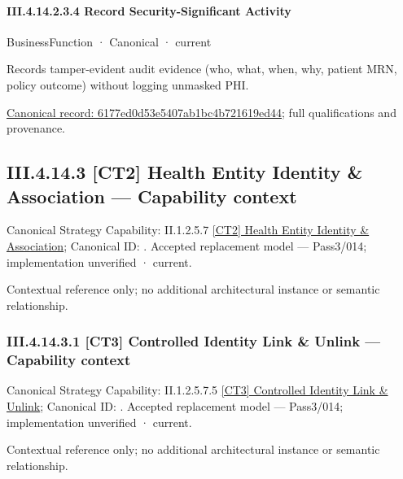 \paragraph*{III.4.14.2.3.4 Record Security-Significant Activity}
\label{navigation:III.4.14.2.3.4}

\label{element:6177ed0d53e5407ab1bc4b721619ed44}
{\small BusinessFunction · Canonical · current}\par

Records tamper-evident audit evidence (who, what, when, why, patient MRN, policy outcome) without logging unmasked PHI.


{\footnotesize \href{../../../../continuum/business/business-function/6177ed0d53e5407ab1bc4b721619ed44.md}{Canonical record: 6177ed0d53e5407ab1bc4b721619ed44}; full qualifications and provenance.}\par
\subsection*{III.4.14.3 [CT2] Health Entity Identity \& Association — Capability context}
\label{navigation:III.4.14.3}

{\small Canonical Strategy Capability: II.1.2.5.7 \hyperref[element:7cbb4c6253164e19ab3a126c8f176f21]{[CT2] Health Entity Identity \& Association}; Canonical ID: \texttt{}. Accepted replacement model — Pass3/014; implementation unverified · current.}\par
Contextual reference only; no additional architectural instance or semantic relationship.\par
\subsubsection*{III.4.14.3.1 [CT3] Controlled Identity Link \& Unlink — Capability context}
\label{navigation:III.4.14.3.1}

{\small Canonical Strategy Capability: II.1.2.5.7.5 \hyperref[element:34f95770622e4077a87a669f9b279019]{[CT3] Controlled Identity Link \& Unlink}; Canonical ID: \texttt{}. Accepted replacement model — Pass3/014; implementation unverified · current.}\par
Contextual reference only; no additional architectural instance or semantic relationship.\par

